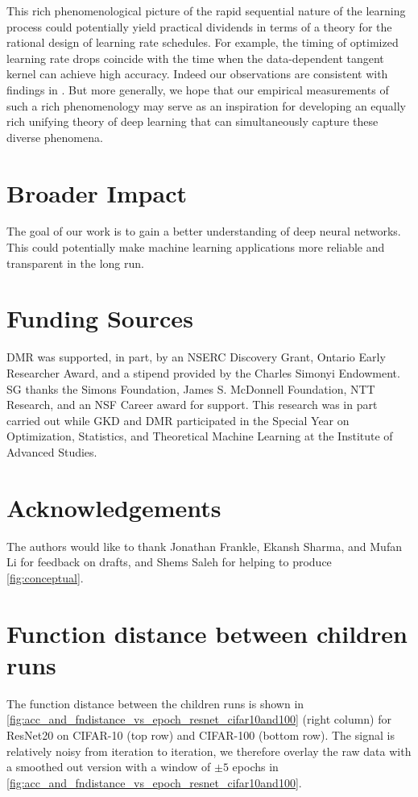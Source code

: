 \documentclass{article}
\begin{document}
This rich phenomenological picture of the rapid sequential nature of the learning process could potentially yield practical dividends in terms of a theory for the rational design of learning rate schedules. For example, the timing of optimized learning rate drops coincide with the time when the data-dependent tangent kernel can achieve high accuracy. Indeed our observations are consistent with findings in \citep{leclerc2020two}. But more generally, we hope that our empirical measurements of such a rich phenomenology may serve as an inspiration for developing an equally rich unifying theory of deep learning that can simultaneously capture these diverse phenomena.


\section*{Broader Impact}
The goal of our work is to gain a better understanding of deep neural networks. This could potentially make machine learning applications more reliable and transparent in the long run.


\section*{Funding Sources}

DMR was supported, in part, by an NSERC Discovery Grant, Ontario Early Researcher Award, and a stipend provided by the Charles Simonyi Endowment. SG thanks the Simons Foundation, James S. McDonnell Foundation, NTT Research, and an NSF Career award for support. This research was in part carried out while GKD and DMR participated in the Special Year on Optimization, Statistics, and Theoretical Machine Learning at the Institute of Advanced Studies.

\section*{Acknowledgements}

The authors would like to thank Jonathan Frankle, Ekansh Sharma, and Mufan Li for feedback on drafts, and Shems Saleh for helping to produce \cref{fig:conceptual}.



\small

%
%
%
\printbibliography

\clearpage
\appendix

\section{Function distance between children runs}
The function distance between the children runs is shown in \cref{fig:acc_and_fndistance_vs_epoch_resnet_cifar10and100} (right column) for ResNet20 on CIFAR-10 (top row) and CIFAR-100 (bottom row). The signal is relatively noisy from iteration to iteration, we therefore overlay the raw data with a smoothed out version with a window of $\pm5$ epochs in \cref{fig:acc_and_fndistance_vs_epoch_resnet_cifar10and100}. 
\end{document}
